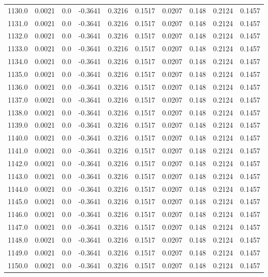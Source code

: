 \begin{longtable}{lrrrrrrrrr}
1130.0 & 0.0021 & 0.0 & -0.3641 & 0.3216 & 0.1517 & 0.0207 & 0.148 & 0.2124 & 0.1457 \\
1131.0 & 0.0021 & 0.0 & -0.3641 & 0.3216 & 0.1517 & 0.0207 & 0.148 & 0.2124 & 0.1457 \\
1132.0 & 0.0021 & 0.0 & -0.3641 & 0.3216 & 0.1517 & 0.0207 & 0.148 & 0.2124 & 0.1457 \\
1133.0 & 0.0021 & 0.0 & -0.3641 & 0.3216 & 0.1517 & 0.0207 & 0.148 & 0.2124 & 0.1457 \\
1134.0 & 0.0021 & 0.0 & -0.3641 & 0.3216 & 0.1517 & 0.0207 & 0.148 & 0.2124 & 0.1457 \\
1135.0 & 0.0021 & 0.0 & -0.3641 & 0.3216 & 0.1517 & 0.0207 & 0.148 & 0.2124 & 0.1457 \\
1136.0 & 0.0021 & 0.0 & -0.3641 & 0.3216 & 0.1517 & 0.0207 & 0.148 & 0.2124 & 0.1457 \\
1137.0 & 0.0021 & 0.0 & -0.3641 & 0.3216 & 0.1517 & 0.0207 & 0.148 & 0.2124 & 0.1457 \\
1138.0 & 0.0021 & 0.0 & -0.3641 & 0.3216 & 0.1517 & 0.0207 & 0.148 & 0.2124 & 0.1457 \\
1139.0 & 0.0021 & 0.0 & -0.3641 & 0.3216 & 0.1517 & 0.0207 & 0.148 & 0.2124 & 0.1457 \\
1140.0 & 0.0021 & 0.0 & -0.3641 & 0.3216 & 0.1517 & 0.0207 & 0.148 & 0.2124 & 0.1457 \\
1141.0 & 0.0021 & 0.0 & -0.3641 & 0.3216 & 0.1517 & 0.0207 & 0.148 & 0.2124 & 0.1457 \\
1142.0 & 0.0021 & 0.0 & -0.3641 & 0.3216 & 0.1517 & 0.0207 & 0.148 & 0.2124 & 0.1457 \\
1143.0 & 0.0021 & 0.0 & -0.3641 & 0.3216 & 0.1517 & 0.0207 & 0.148 & 0.2124 & 0.1457 \\
1144.0 & 0.0021 & 0.0 & -0.3641 & 0.3216 & 0.1517 & 0.0207 & 0.148 & 0.2124 & 0.1457 \\
1145.0 & 0.0021 & 0.0 & -0.3641 & 0.3216 & 0.1517 & 0.0207 & 0.148 & 0.2124 & 0.1457 \\
1146.0 & 0.0021 & 0.0 & -0.3641 & 0.3216 & 0.1517 & 0.0207 & 0.148 & 0.2124 & 0.1457 \\
1147.0 & 0.0021 & 0.0 & -0.3641 & 0.3216 & 0.1517 & 0.0207 & 0.148 & 0.2124 & 0.1457 \\
1148.0 & 0.0021 & 0.0 & -0.3641 & 0.3216 & 0.1517 & 0.0207 & 0.148 & 0.2124 & 0.1457 \\
1149.0 & 0.0021 & 0.0 & -0.3641 & 0.3216 & 0.1517 & 0.0207 & 0.148 & 0.2124 & 0.1457 \\
1150.0 & 0.0021 & 0.0 & -0.3641 & 0.3216 & 0.1517 & 0.0207 & 0.148 & 0.2124 & 0.1457 \\

\end{longtable}

